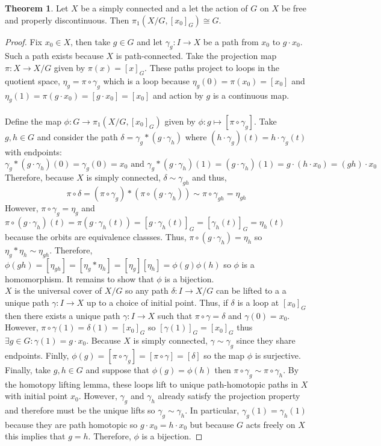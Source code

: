 \documentclass[12pt]{article}
\theoremstyle{remark}
\theoremstyle{definition}
\newtheorem{theorem}{Theorem}[section]
\begin{document}
\newpage

\begin{theorem}
Let $X$ be a simply connected and a let the action of $G$ on $X$ be free and properly discontinuous. Then $\pi_1(X/G, [x_0]_G) \cong G$.
\end{theorem} 

\begin{proof}
Fix $x_0 \in X$, then take $g \in G$ and let $\gamma_g : I \to X$ be a path from $x_0$ to $g \cdot x_0$. Such a path exists because $X$ is path-connected. Take the projection map $\pi : X \to X/G$ given by $\pi(x) = [x]_G$. These paths project to loops in the quotient space, $\eta_g = \pi \circ \gamma_g$ which is a loop because $\eta_g(0) = \pi(x_0) = [x_0]$ and $\eta_g(1) = \pi(g \cdot x_0) = [g \cdot x_0] = [x_0]$ and action by $g$ is a continuous map. \\\\
Define the map $\phi : G \to \pi_1(X/G, [x_0]_G)$ given by $\phi : g \mapsto [\pi \circ \gamma_g]$. Take $g, h \in G$ and consider the path $\delta = \gamma_g * (g \cdot \gamma_h)$  where $(h \cdot \gamma_g)(t) = h \cdot \gamma_g(t)$ with endpoints:
\[\gamma_g * (g \cdot \gamma_h)(0) = \gamma_g(0) = x_0 \text{ and } \gamma_g * (g \cdot \gamma_h)(1) = (g \cdot \gamma_h)(1) = g \cdot (h \cdot x_0) = (gh) \cdot x_0\]
Therefore, because $X$ is simply connected, $\delta \sim \gamma_{gh}$ and thus, 
\[\pi \circ \delta = (\pi \circ \gamma_g) * (\pi \circ (g \cdot \gamma_h)) \sim \pi \circ \gamma_{gh} = \eta_{gh}\]
However, $\pi \circ \gamma_g = \eta_g$ and $\pi \circ (g \cdot \gamma_h)(t) = \pi(g \cdot \gamma_h(t)) = [g \cdot \gamma_h(t)]_G = [\gamma_h(t)]_G = \eta_h(t)$ because the orbits are equivalence classses. Thus, $\pi \circ (g \cdot \gamma_h) = \eta_h$ so $\eta_g * \eta_h \sim \eta_{gh}$. 
Therefore, $\phi(gh) = [\eta_{gh}] = [\eta_g * \eta_h] = [\eta_g] [\eta_h] = \phi(g) \phi(h)$ so $\phi$ is a homomorphism. It remains to show that $\phi$ is a bijection. \bigskip \\
$X$ is the universal cover of $X/G$ so any path $\delta : I \to X/G$ can be lifted to a a unique path $\gamma : I \to X$ up to a choice of initial point. Thus, if $\delta$ is a loop at $[x_0]_G$ then there exists a unique path $\gamma : I \to X$ such that $\pi \circ \gamma = \delta$ and $\gamma(0) = x_0$. However, $\pi \circ \gamma(1) = \delta(1) = [x_0]_G$ so $[\gamma(1)]_G = [x_0]_G$ thus $\exists g \in G : \gamma(1) = g \cdot x_0$. Because $X$ is simply connected, $\gamma \sim \gamma_g$ since they share endpoints. Finlly, $\phi(g) = [\pi \circ \gamma_g] = [\pi \circ \gamma] = [\delta]$ so the map $\phi$ is surjective. Finally, take $g, h \in G$ and suppose that $\phi(g) = \phi(h)$ then $\pi \circ \gamma_g \sim \pi \circ \gamma_h$. By the homotopy lifting lemma, these loops lift to unique path-homotopic paths in $X$ with initial point $x_0$. However, $\gamma_g$ and $\gamma_h$ already satisfy the projection property and therefore must be the unique lifts so $\gamma_g \sim \gamma_h$. In particular, $\gamma_g(1) = \gamma_h(1)$ because they are path homotopic so $g \cdot x_0 = h \cdot x_0$ but because $G$ acts freely on $X$ this implies that $g = h$. Therefore, $\phi$ is a bijection.      
\end{proof}
\end{document}
